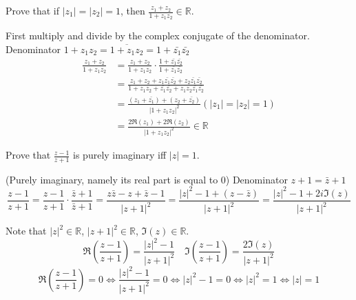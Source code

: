 \begin{example}
Prove that if $\lvert z_1 \rvert =\lvert z_2 \rvert =1$, then $\frac{z_1+z_2}{1+z_1z_2} \in \mathbb{R}$.

\begin{soln} 
First multiply and divide by the complex conjugate of the denominator.
Denominator $1+z_1z_2 = \overline{1+z_1z_2} = 1+\bar{z_1}\bar{z_2}$
\begin{align*}
  \frac{z_1+z_2}{1+z_1z_2} &= \frac{z_1+z_2}{1+z_1z_2} \cdot \frac{1+\bar{z_1}\bar{z_2}}{1+\bar{z_1}\bar{z_2}} \\
  &= \frac{z_1+z_2+z_1\bar{z_1}\bar{z_2}+z_2\bar{z_1}\bar{z_2}}{1+z_1z_2+\bar{z_1}\bar{z_2}+z_1z_2\bar{z_1}\bar{z_2}} \\
  &= \frac{(z_1+\bar{z_1}) + (z_2+\bar{z_2})}{ \lvert 1+z_1z_2 \rvert ^2 } (\rvert z_1 \lvert=\rvert z_2 \lvert =1)\\
  &= \frac{2\Re(z_1)+2\Re(z_2)}{ \lvert 1+z_1z_2 \rvert ^2 } \in \mathbb{R}
\end{align*}
\end{soln}
\end{example}

\begin{example}
Prove that $\frac{z-1}{z+1}$ is purely imaginary iff $\lvert z\rvert=1$.

\begin{soln} (Purely imaginary, namely its real part is equal to 0)
Denominator $z+1 = \bar{z}+1$
\[ \frac{z-1}{z+1} = \frac{z-1}{z+1} \cdot \frac{\bar{z}+1}{\bar{z}+1} = \frac{z\bar{z}-z+\bar{z}-1}{ \lvert z+1 \rvert ^2 } = \frac{\lvert z\rvert^2-1 + (z-\bar{z})}{ \lvert z+1 \rvert ^2 } = \frac{\lvert z\rvert^2-1 + 2i\Im(z)}{ \lvert z+1 \rvert ^2 } \]

Note that $\lvert z\rvert^2 \in \mathbb{R}$, $\lvert z+1 \rvert ^2  \in \mathbb{R}$, $\Im(z) \in \mathbb{R}$.
\[ \Re(\frac{z-1}{z+1}) = \frac{\lvert z\rvert^2-1}{ \lvert z+1 \rvert ^2 } \quad \Im(\frac{z-1}{z+1}) = \frac{2\Im(z)}{ \lvert z+1 \rvert ^2 } \]
\[ \Re(\frac{z-1}{z+1}) = 0 \iff \frac{\lvert z\rvert^2-1}{ \lvert z+1 \rvert ^2 } = 0 \iff \lvert z\rvert^2-1 = 0 \iff \lvert z\rvert^2=1 \iff \lvert z\rvert=1 \]
\end{soln}
\end{example}


